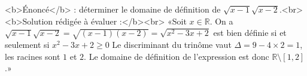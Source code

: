 <b>Énoncé</b> : déterminer le domaine de définition de $\sqrt{x-1}\sqrt{x-2}$.<br> <b>Solution rédigée à évaluer :</b><br>  «Soit $x\in\mathbb{R}$. On a $\sqrt{x-1}\sqrt{x-2}=\sqrt{(x-1)(x-2)}=\sqrt{x^2-3x+2}$ est bien définie si et seulement si $x^2-3x+2\geq0$ Le discriminant du trinôme vaut $\Delta = 9-4\times2=1$, les racines sont $1$ et $2$. Le domaine de définition de l'expression est donc $\mathbb{R}\setminus [1,2]$.»

\begin{reponses}
\end{reponses}

\begin{comment}
La toute première étape est incorrecte (et la dernière aussi).
\end{comment}

